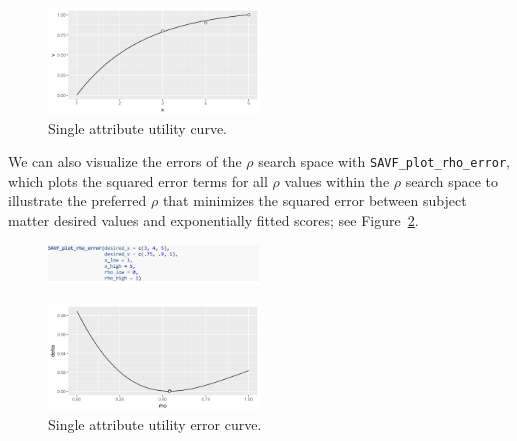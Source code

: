 \documentclass[twocolumn]{svjour3}       %
\begin{document}
\begin{figure}[!htb]
  \includegraphics[width=0.5\textwidth]{fig3.png}
  \caption{Single attribute utility curve.}
  \label{fig:3}
\end{figure}

We can also visualize the errors of the $\rho$ search space with \texttt{\texttt{SAVF\_plot}\_rho\_error}, which plots the squared error terms for all $\rho$ values within the $\rho$ search space to illustrate the preferred $\rho$ that minimizes the squared error between subject matter desired values and exponentially fitted scores; see Figure~\ref{fig:4}.
\begin{figure}[!htb]
  \includegraphics[width=0.5\textwidth]{code7.png}
\end{figure}

\begin{figure}[H]%
  \includegraphics[width=0.5\textwidth]{fig4.png}
  \caption{Single attribute utility error curve.}
  \label{fig:4}
\end{figure}
\end{document}
